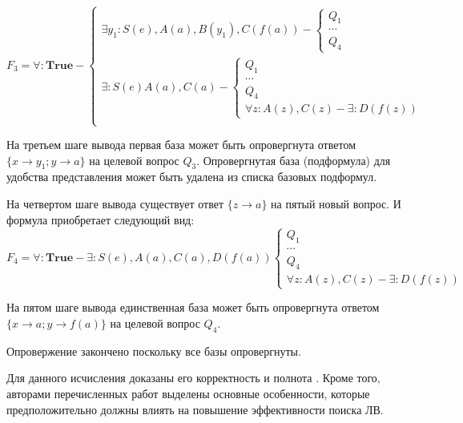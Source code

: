\begin{example}
\begin{equation*}\label{ex:f3}
F_3 =
\forall:\boldsymbol{True} -
\left\lbrace
\begin{array}{l}
	\exists y_1\colon S(e),A(a),B(y_1),C(f(a)) -
	\left\lbrace
	\begin{array}{l}
		Q_1 \\ \cdots \\ Q_4
	\end{array}\right. \\
	\exists\colon S(e)A(a),C(a) -
	\left\lbrace
	\begin{array}{l}
		Q_1 \\ \cdots \\ Q_4 \\
		\forall z\colon A(z),C(z) - \exists\colon D(f(z))
	\end{array}\right. \\
\end{array}\right.
\end{equation*}

На третьем шаге вывода первая база может быть опровергнута ответом $\{x \rightarrow y_1; y \rightarrow a\}$ на целевой вопрос $Q_3$. Опровергнутая база (подформула) для удобства представления может быть удалена из списка базовых подформул.

На четвертом шаге вывода существует ответ $\{z \rightarrow a\}$ на пятый новый вопрос. И формула приобретает следующий вид:
\begin{equation*}\label{ex:f5}
	F_4 = \forall\colon\boldsymbol{True} - \exists\colon S(e),A(a), C(a),D(f(a))
	\left\lbrace
	\begin{array}{l}
		Q_1 \\ \cdots \\ Q_4 \\
		\forall z\colon A(z),C(z) - \exists\colon D(f(z))
	\end{array}\right.
\end{equation*}

На пятом шаге вывода единственная база может быть опровергнута ответом $\{x \rightarrow a; y \rightarrow f(a)\}$ на целевой вопрос $Q_4$.

Опровержение закончено поскольку все базы опровергнуты.

\end{example}

Для данного исчисления доказаны его корректность и полнота \cite{ICDS2000, DavydovX}. Кроме того, авторами перечисленных работ выделены основные особенности, которые предположительно должны влиять на повышение эффективности поиска ЛВ.

